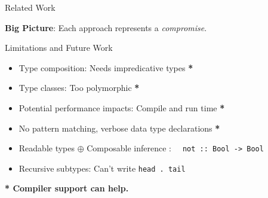 \documentclass[final]{beamer}
\begin{document}
\begin{frame}[fragile]
\begin{columns}[t]
\begin{column}{.285\textwidth}
\begin{block}{Related Work}

\textbf{Big Picture}: Each approach represents a \emph{compromise}.

\end{block}
\vspace{1.5cm}
\begin{block}{Limitations and Future Work}
\vspace{0.5cm}
\begin{itemize}
\item Type composition: Needs impredicative types \textbf{*}
\item Type classes: Too polymorphic \textbf{*}
\item Potential performance impacts: Compile and run time \textbf{*}
\item No pattern matching, verbose data type declarations \textbf{*}
\item Readable types $\oplus$ Composable inference : \verb!  not :: Bool -> Bool!
\item Recursive subtypes: Can't write \verb!head . tail!
\end{itemize}
\textbf{* Compiler support can help.}
\end{block}

\end{column}
\end{columns}
\end{frame}
\end{document}
